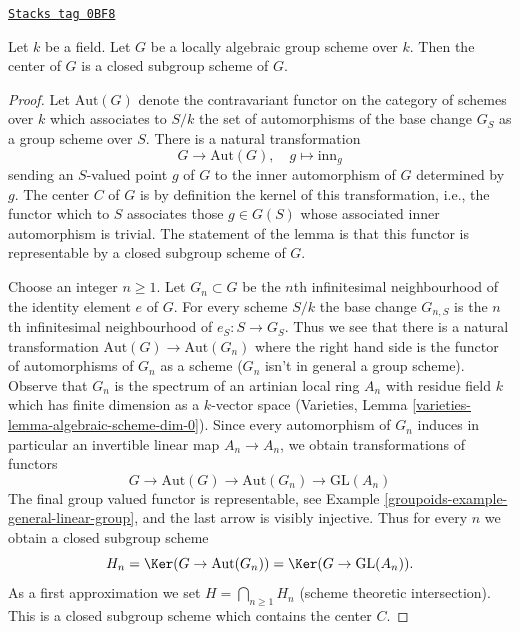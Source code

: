 \begin{lemma}
\label{groupoids-lemma-algebraic-center}
\href{https://stacks.math.columbia.edu/tag/0BF8}{\texttt{Stacks tag 0BF8}}

Let $k$ be a field. Let $G$ be a locally algebraic group scheme over $k$.
Then the center of $G$ is a closed subgroup scheme of $G$.
\end{lemma}

\begin{proof}

Let $\text{Aut}(G)$ denote the contravariant functor on the category of
schemes over $k$ which associates to $S/k$ the set of automorphisms
of the base change $G_S$ as a group scheme over $S$. There is a natural
transformation
$$
G \longrightarrow \text{Aut}(G),\quad
g \longmapsto \text{inn}_g
$$
sending an $S$-valued point $g$ of $G$ to the inner automorphism of $G$
determined by $g$. The center $C$ of $G$ is by definition the kernel of
this transformation, i.e., the functor which to $S$ associates those
$g \in G(S)$ whose associated inner automorphism is trivial. The statement
of the lemma is that this functor is representable by a closed subgroup
scheme of $G$.

\medskip\noindent
Choose an integer $n \geq 1$. Let $G_n \subset G$ be the $n$th infinitesimal
neighbourhood of the identity element $e$ of $G$. For every scheme $S/k$
the base change $G_{n, S}$ is the $n$th infinitesimal neighbourhood of
$e_S : S \to G_S$. Thus we see that there is a natural transformation
$\text{Aut}(G) \to \text{Aut}(G_n)$ where the right hand side is the
functor of automorphisms of $G_n$ as a scheme ($G_n$ isn't in general
a group scheme). Observe that $G_n$ is the spectrum of an artinian
local ring $A_n$ with residue field $k$ which has finite dimension
as a $k$-vector space
(Varieties, Lemma \ref{varieties-lemma-algebraic-scheme-dim-0}).
Since every automorphism of $G_n$ induces in particular an invertible
linear map $A_n \to A_n$, we obtain transformations of functors
$$
G \to \text{Aut}(G) \to \text{Aut}(G_n) \to \text{GL}(A_n)
$$
The final group valued functor is representable, see
Example \ref{groupoids-example-general-linear-group}, and the
last arrow is visibly injective.
Thus for every $n$ we obtain a closed subgroup scheme
$$
H_n = \Ker(G \to \text{Aut}(G_n)) = \Ker(G \to \text{GL}(A_n)).
$$
As a first approximation we set $H = \bigcap_{n \geq 1} H_n$
(scheme theoretic intersection). This is a closed subgroup scheme
which contains the center $C$.


\end{proof}
